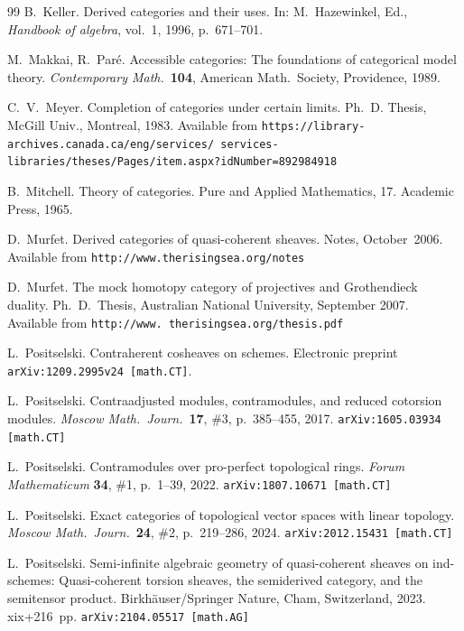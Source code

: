 \documentclass[12pt,a4paper]{amsart}
\newcommand{\+}{\protect\nobreakdash-}
\renewcommand{\:}{\colon}
\theoremstyle{plain}
\theoremstyle{definition}
\begin{document}
\begin{thebibliography}{99}
 B.~Keller.
   Derived categories and their uses.
In: M.~Hazewinkel, Ed., \textit{Handbook of algebra}, vol.~1,
1996, p.~671--701.

 M.~Makkai, R.~Par\'e.
   Accessible categories: The foundations of categorical model theory.
\textit{Contemporary Math.}\ \textbf{104}, American Math.\ Society,
Providence, 1989.

 C.~V.~Meyer.
   Completion of categories under certain limits.
Ph.~D. Thesis, McGill Univ., Montreal, 1983.
Available from
\texttt{https://library-archives.canada.ca/eng/services/
services-libraries/theses/Pages/item.aspx?idNumber=892984918}
{\par}

 B.~Mitchell.
   Theory of categories.
Pure and Applied Mathematics, 17.  Academic Press, 1965.

 D.~Murfet.
   Derived categories of quasi-coherent sheaves.
Notes, October~2006.
Available from \texttt{http://www.therisingsea.org/notes}

 D.~Murfet.
   The mock homotopy category of projectives and Grothendieck duality.
Ph.~D.\ Thesis, Australian National University, September 2007.
Available from \texttt{http://www. therisingsea.org/thesis.pdf}
{\par}

 L.~Positselski.
   Contraherent cosheaves on schemes.
Electronic preprint \texttt{arXiv:1209.2995v24 [math.CT]}.

 L.~Positselski.
   Contraadjusted modules, contramodules, and reduced cotorsion modules.
\textit{Moscow Math.\ Journ.}\ \textbf{17}, \#3, p.~385--455, 2017.
\texttt{arXiv:1605.03934 [math.CT]}

 L.~Positselski.
   Contramodules over pro-perfect topological rings.
\textit{Forum Mathematicum} \textbf{34}, \#1, p.~1--39, 2022.
\texttt{arXiv:1807.10671 [math.CT]}

 L.~Positselski.
   Exact categories of topological vector spaces with linear topology.
\textit{Moscow Math.\ Journ.}\ \textbf{24}, \#2, p.~219--286, 2024.
\texttt{arXiv:2012.15431 [math.CT]}

 L.~Positselski.
   Semi-infinite algebraic geometry of quasi-coherent sheaves
on ind-schemes: Quasi-coherent torsion sheaves, the semiderived
category, and the semitensor product.
Birkh\"auser/Springer Nature, Cham, Switzerland, 2023.  xix+216~pp.
\texttt{arXiv:2104.05517 [math.AG]}


\end{thebibliography}
\end{document}
